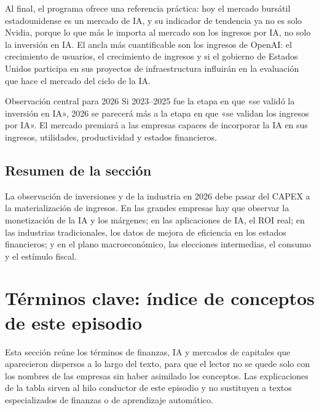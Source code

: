 \documentclass[a4paper]{article}
\begin{document}
Al final, el programa ofrece una referencia práctica: hoy el mercado bursátil estadounidense es un mercado de IA, y su indicador de tendencia ya no es solo Nvidia, porque lo que más le importa al mercado son los ingresos por IA, no solo la inversión en IA. El ancla más cuantificable son los ingresos de OpenAI: el crecimiento de usuarios, el crecimiento de ingresos y si el gobierno de Estados Unidos participa en sus proyectos de infraestructura influirán en la evaluación que hace el mercado del ciclo de la IA.

\begin{importantbox}{Observación central para 2026}
Si 2023--2025 fue la etapa en que «se validó la inversión en IA», 2026 se parecerá más a la etapa en que «se validan los ingresos por IA». El mercado premiará a las empresas capaces de incorporar la IA en sus ingresos, utilidades, productividad y estados financieros.
\end{importantbox}

\subsection{Resumen de la sección}

La observación de inversiones y de la industria en 2026 debe pasar del CAPEX a la materialización de ingresos. En las grandes empresas hay que observar la monetización de la IA y los márgenes; en las aplicaciones de IA, el ROI real; en las industrias tradicionales, los datos de mejora de eficiencia en los estados financieros; y en el plano macroeconómico, las elecciones intermedias, el consumo y el estímulo fiscal.
\section{Términos clave: índice de conceptos de este episodio}

Esta sección reúne los términos de finanzas, IA y mercados de capitales que aparecieron dispersos a lo largo del texto, para que el lector no se quede solo con los nombres de las empresas sin haber asimilado los conceptos. Las explicaciones de la tabla sirven al hilo conductor de este episodio y no sustituyen a textos especializados de finanzas o de aprendizaje automático.
\end{document}
